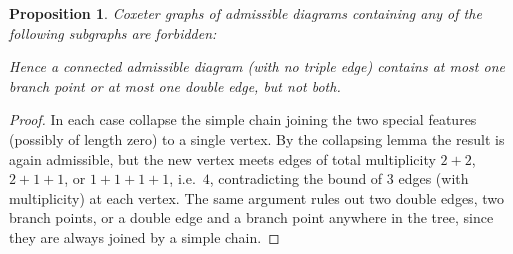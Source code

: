 \documentclass[11pt,openany]{book}
\theoremstyle{plain}
\newtheorem{proposition}[theorem]{Proposition}
\theoremstyle{definition}
\theoremstyle{remark}
\newcommand{\added}[1]{{\color{addcol}#1}}
\begin{document}
\begin{proposition}\label{L04b:prop:forbidden}
Coxeter graphs of admissible diagrams containing any of the following subgraphs are forbidden:
\begin{center}
\end{center}
Hence a connected admissible diagram (with no triple edge) contains at most one branch
point \emph{or} at most one double edge, but not both.
\end{proposition}

\begin{proof}
\added{In each case collapse the simple chain joining the two special features (possibly of
length zero) to a single vertex. By the collapsing lemma the result is again admissible, but the
new vertex meets edges of total multiplicity $2+2$, $2+1+1$, or $1+1+1+1$, i.e.\ $4$, contradicting
the bound of $3$ edges (with multiplicity) at each vertex. The same argument rules out two double
edges, two branch points, or a double edge and a branch point anywhere in the tree, since they are
always joined by a simple chain.}
\end{proof}
\end{document}
